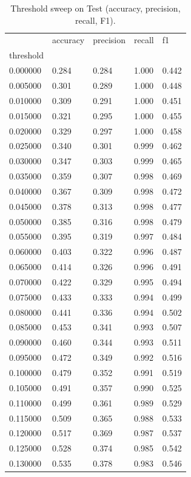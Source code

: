 \begin{table}[htbp]
\centering
\caption{Threshold sweep on Test (accuracy, precision, recall, F1).}
\label{tab:08-threshold-sweep-selfcheck}
\begin{tabular}{lllll}
\toprule
 & accuracy & precision & recall & f1 \\
threshold &  &  &  &  \\
\midrule
0.000000 & 0.284 & 0.284 & 1.000 & 0.442 \\
0.005000 & 0.301 & 0.289 & 1.000 & 0.448 \\
0.010000 & 0.309 & 0.291 & 1.000 & 0.451 \\
0.015000 & 0.321 & 0.295 & 1.000 & 0.455 \\
0.020000 & 0.329 & 0.297 & 1.000 & 0.458 \\
0.025000 & 0.340 & 0.301 & 0.999 & 0.462 \\
0.030000 & 0.347 & 0.303 & 0.999 & 0.465 \\
0.035000 & 0.359 & 0.307 & 0.998 & 0.469 \\
0.040000 & 0.367 & 0.309 & 0.998 & 0.472 \\
0.045000 & 0.378 & 0.313 & 0.998 & 0.477 \\
0.050000 & 0.385 & 0.316 & 0.998 & 0.479 \\
0.055000 & 0.395 & 0.319 & 0.997 & 0.484 \\
0.060000 & 0.403 & 0.322 & 0.996 & 0.487 \\
0.065000 & 0.414 & 0.326 & 0.996 & 0.491 \\
0.070000 & 0.422 & 0.329 & 0.995 & 0.494 \\
0.075000 & 0.433 & 0.333 & 0.994 & 0.499 \\
0.080000 & 0.441 & 0.336 & 0.994 & 0.502 \\
0.085000 & 0.453 & 0.341 & 0.993 & 0.507 \\
0.090000 & 0.460 & 0.344 & 0.993 & 0.511 \\
0.095000 & 0.472 & 0.349 & 0.992 & 0.516 \\
0.100000 & 0.479 & 0.352 & 0.991 & 0.519 \\
0.105000 & 0.491 & 0.357 & 0.990 & 0.525 \\
0.110000 & 0.499 & 0.361 & 0.989 & 0.529 \\
0.115000 & 0.509 & 0.365 & 0.988 & 0.533 \\
0.120000 & 0.517 & 0.369 & 0.987 & 0.537 \\
0.125000 & 0.528 & 0.374 & 0.985 & 0.542 \\
0.130000 & 0.535 & 0.378 & 0.983 & 0.546 \\

\end{tabular}
\end{table}
